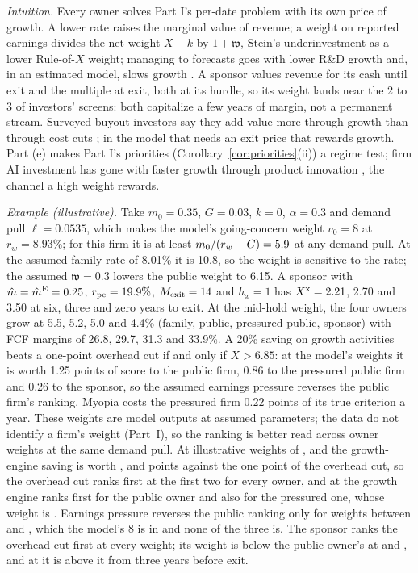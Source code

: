 \noindent\emph{Intuition.} Every owner solves Part I's per-date problem with its own price of growth. A lower rate raises the marginal value of revenue; a weight on reported earnings divides the net weight $X-k$ by $1+\mathfrak w$, Stein's underinvestment \citep{stein1989efficient} as a lower Rule-of-$X$ weight; managing to forecasts goes with lower R\&D growth and, in an estimated model, slows growth \citep{terry2023macro}. A sponsor values revenue for its cash until exit and the multiple at exit, both at its hurdle, so its weight lands near the 2 to 3 of investors' screens: both capitalize a few years of margin, not a permanent stream. Surveyed buyout investors say they add value more through growth than through cost cuts \citep{gompers2016what}; in the model that needs an exit price that rewards growth. Part (e) makes Part I's priorities (Corollary~\ref{cor:priorities}(ii)) a regime test; firm AI investment has gone with faster growth through product innovation \citep{babina2024artificial}, the channel a high weight rewards.

\noindent\emph{Example (illustrative).} Take $m_0=0.35$, $G=0.03$, $k=0$, $\alpha=0.3$ and demand pull $\ell=0.0535$, which makes the model's going-concern weight $v_0=8$ at $r_w=8.93\%$; for this firm it is at least $m_0/(r_w-G)=5.9$ at any demand pull. At the assumed family rate of 8.01\% it is 10.8, so the weight is sensitive to the rate; the assumed $\mathfrak w=0.3$ lowers the public weight to 6.15. A sponsor with $\hat m=\hat m^{\rm E}=0.25$, $r_{\rm pe}=19.9\%$, $M_{\rm exit}=14$ and $h_x=1$ has $X^{\rm x}=2.21$, 2.70 and 3.50 at six, three and zero years to exit. At the mid-hold weight, the four owners grow at 5.5, 5.2, 5.0 and 4.4\% (family, public, pressured public, sponsor) with FCF margins of 26.8, 29.7, 31.3 and 33.9\%. A 20\% saving on growth activities beats a one-point overhead cut if and only if $X>6.85$: at the model's weights it is worth 1.25 points of score to the public firm, 0.86 to the pressured public firm and 0.26 to the sponsor, so the assumed earnings pressure reverses the public firm's ranking. Myopia costs the pressured firm 0.22 points of its true criterion a year. These weights are model outputs at assumed parameters; the data do not identify a firm's weight (Part~I), so the ranking is better read across owner weights at the same demand pull. At illustrative weights of \regXbOne, \regXbTwo{} and \regXbThree{} the growth-engine saving is worth \regXbGainOne, \regXbGainTwo{} and \regXbGainThree{} points against the one point of the overhead cut, so the overhead cut ranks first at the first two for every owner, and at \regXbThree{} the growth engine ranks first for the public owner and also for the pressured one, whose weight is \regXbMyThree. Earnings pressure reverses the public ranking only for weights between \regXbBandLo{} and \regXbBandHi, which the model's 8 is in and none of the three is. The sponsor ranks the overhead cut first at every weight; its weight is below the public owner's at \regXbTwo{} and \regXbThree, and at \regXbOne{} it is above it from three years before exit. %

